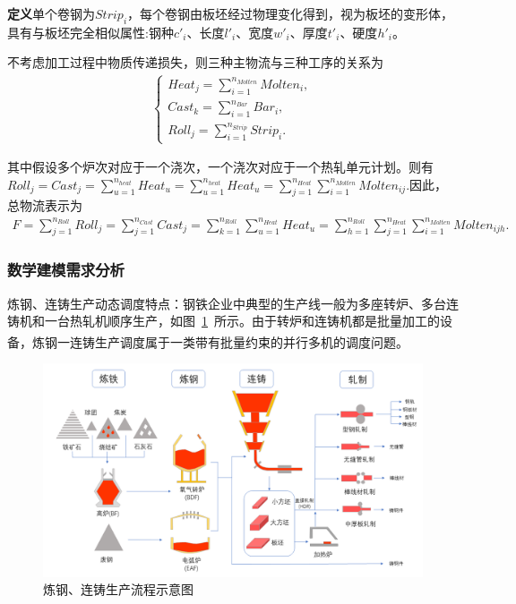 \documentclass{whutmod}
\newcommand{\upcite}[1]{\textsuperscript{\cite{#1}}}
\begin{document}
\textbf{定义}单个卷钢为$Strip_i$，每个卷钢由板坯经过物理变化得到，视为板坯的变形体，具有与板坯完全相似属性:钢种$c'_i$、长度$l'_i$、宽度$w'_i$、厚度$t'_i$、硬度$h'_i$。

不考虑加工过程中物质传递损失，则三种主物流与三种工序的关系为
\begin{gather}
\left\{\begin{matrix}
Heat_j=\sum_{i=1}^{n_{Molten}}Molten_i,
\\Cast_k=\sum_{i=1}^{n_{Bar}}Bar_i,
\\ Roll_j=\sum_{i=1}^{n_{Strip}}Strip_i.
\end{matrix}\right.
\end{gather}

其中假设多个炉次对应于一个浇次，一个浇次对应于一个热轧单元计划。则有
$Roll_j=Cast_j=\sum_{u=1}^{n_{heat}}Heat_u=\sum_{u=1}^{n_{heat}}Heat_u=\sum_{j=1}^{n_{Heat}}\sum_{i=1}^{n_{Molten}}Molten_{ij}.$因此，总物流表示为
\begin{gather*}
F=\sum_{j=1}^{n_{Roll}}Roll_j=\sum_{j=1}^{n_{Cast}}Cast_j=\sum_{k=1}^{n_{Roll}}\sum_{u=1}^{n_{Heat}}Heat_u=\sum_{h=1}^{n_{Roll}}\sum_{j=1}^{n_{Heat}}\sum_{i=1}^{n_{Molten}}Molten_{ijh}.
\end{gather*}

\subsubsection{数学建模需求分析}
炼钢、连铸生产动态调度特点：钢铁企业中典型的生产线一般为多座转炉、多台连铸机和一台热轧机顺序生产，如图~\ref{111sad1sssssss11}~所示。由于转炉和连铸机都是批量加工的设备，炼钢一连铸生产调度属于一类带有批量约束的并行多机的调度问题\upcite{2}。

\begin{figure}[H]
\centering
\includegraphics[width=.8\textwidth]{figures/big.png}
\caption{炼钢、连铸生产流程示意图}\label{111sad1sssssss11}
\end{figure}
\end{document}
